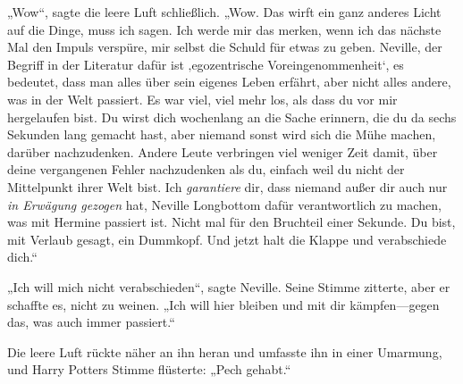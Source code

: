 „Wow“, sagte die leere Luft schließlich. „Wow. Das wirft ein ganz anderes Licht auf die Dinge, muss ich sagen. Ich werde mir das merken, wenn ich das nächste Mal den Impuls verspüre, mir selbst die Schuld für etwas zu geben. Neville, der Begriff in der Literatur dafür ist ‚egozentrische Voreingenommenheit‘, es bedeutet, dass man alles über sein eigenes Leben erfährt, aber nicht alles andere, was in der Welt passiert. Es war viel, viel mehr los, als dass du vor mir hergelaufen bist. Du wirst dich wochenlang an die Sache erinnern, die du da sechs Sekunden lang gemacht hast, aber niemand sonst wird sich die Mühe machen, darüber nachzudenken. Andere Leute verbringen viel weniger Zeit damit, über deine vergangenen Fehler nachzudenken als du, einfach weil du nicht der Mittelpunkt ihrer Welt bist. Ich \emph{garantiere} dir, dass niemand außer dir auch nur \emph{in Erwägung gezogen} hat, Neville Longbottom dafür verantwortlich zu machen, was mit Hermine passiert ist. Nicht mal für den Bruchteil einer Sekunde. Du bist, mit Verlaub gesagt, ein Dummkopf. Und jetzt halt die Klappe und verabschiede dich.“

„Ich will mich nicht verabschieden“, sagte Neville. Seine Stimme zitterte, aber er schaffte es, nicht zu weinen. „Ich will hier bleiben und mit dir kämpfen—gegen das, was auch immer passiert.“

Die leere Luft rückte näher an ihn heran und umfasste ihn in einer Umarmung, und Harry Potters Stimme flüsterte: „Pech gehabt.“

